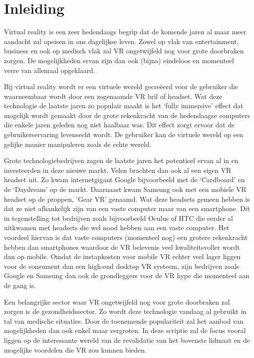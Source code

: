 
\chapter{Inleiding}
\label{ch:inleiding}

Virtual reality is een zeer hedendaags begrip dat de komende jaren al maar meer aandacht zal opeisen in ons dagelijkse leven. Zowel op vlak van entertainment, business en ook op medisch vlak zal VR ongetwijfeld nog voor grote doorbraken zorgen. De mogelijkheden ervan zijn dan ook (bijna) eindeloos en momenteel verre van allemaal opgeklaard.

Bij virtual reality wordt er een virtuele wereld gecreëerd voor de gebruiker die waarneembaar wordt door een zogenaamde VR bril of headset. Wat deze technologie de laatste jaren zo populair maakt is het ‘fully immersive’ effect dat mogelijk wordt gemaakt door de grote rekenkracht van de hedendaagse computers die enkele jaren geleden nog niet haalbaar was. Dit effect zorgt ervoor dat de gebruikerservaring levensecht wordt. De gebruiker kan de virtuele wereld op een gelijke manier manipuleren zoals de echte wereld. 

Grote technologiebedrijven zagen de laatste jaren het potentieel ervan al in en investeerden in deze nieuwe markt. Velen brachten dan ook al een eigen VR headset uit. Zo kwam internetgigant Google bijvoorbeeld met de ‘Cardboard’ en de ‘Daydream’ op de markt. Daarnaast kwam Samsung ook met een mobiele VR headset op de proppen, 'Gear VR’ genaamd. Wat deze headsets gemeen hebben is dat ze niet afhankelijk zijn van een vaste computer maar van een smartphone. Dit in tegenstelling tot bedrijven zoals bijvoorbeeld Oculus of HTC die eerder al uitkwamen met headsets die wel nood hebben aan een vaste computer. Het voordeel hiervan is dat vaste computers (momenteel nog) een grotere rekenkracht hebben dan smartphones waardoor de VR belevenis veel kwaliteitsvoller wordt dan op mobile. Omdat de instapkosten voor mobile VR echter veel lager liggen voor de consument dan een high-end desktop VR systeem, zijn bedrijven zoals Google en Samsung dan ook de grondleggers voor de VR hype die momenteel aan de gang is.

Een belangrijke sector waar VR ongetwijfeld nog voor grote doorbraken zal zorgen is de gezondheidssector. Zo wordt deze technologie vandaag al gebruikt in tal van medische situaties. Door de toenemende populariteit zal het aanbod van mogelijkheden dan ook enkel maar vergroten. In deze scriptie zal de focus vooral liggen op de interessante wereld van de revalidatie van het bovenste lidmaat en de mogelijke voordelen die VR zou kunnen bieden.



